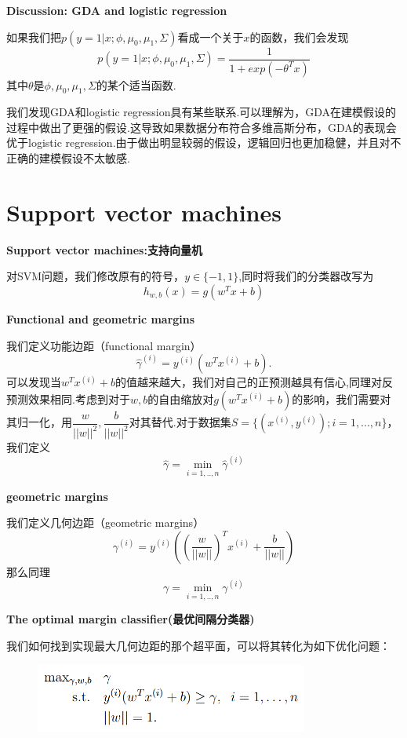 \documentclass[12pt, a4paper, oneside]{ctexbook}
\begin{document}
\hspace*{\fill}


\textbf{Discussion: GDA and logistic regression}

如果我们把$p(y=1|x;\phi,\mu_0,\mu_1,\Sigma)$看成一个关于$x$的函数，我们会发现\[p(y=1|x;\phi,\mu_0,\mu_1,\Sigma)=\dfrac{1}{1+exp(-\theta^{T}x)}\]其中$\theta$是$\phi,\mu_0,\mu_1,\Sigma$的某个适当函数.

\hspace*{\fill}

我们发现GDA和logistic regression具有某些联系.可以理解为，GDA在建模假设的过程中做出了更强的假设.这导致如果数据分布符合多维高斯分布，GDA的表现会优于logistic regression.由于做出明显较弱的假设，逻辑回归也更加稳健，并且对不正确的建模假设不太敏感.


\newpage


\section{Support vector machines}

\textbf{Support vector machines:支持向量机}

对SVM问题，我们修改原有的符号，$y\in \{-1,1\}$,同时将我们的分类器改写为\[h_{w,b}(x)=g(w^{T}x+b)\]

\textbf{Functional and geometric margins}

我们定义功能边距（functional margin）\[\hat{\gamma}^{(i)}=y^{(i)}(w^{T}x^{(i)}+b).\]可以发现当$w^{T}x^{(i)}+b$的值越来越大，我们对自己的正预测越具有信心,同理对反预测效果相同.考虑到对于$w,b$的自由缩放对$g(w^{T}x^{(i)}+b)$的影响，我们需要对其归一化，用$\dfrac{w}{||w||^2},\dfrac{b}{||w||^2}$对其替代.对于数据集$S=\{(x^{(i)},y^{(i)});i=1,...,n\}$，我们定义\[\hat{\gamma}=\min_{i=1,..,n}\hat{\gamma}^{(i)}\]

\hspace*{\fill}

\textbf{geometric margins}

我们定义几何边距（geometric margins）\[\gamma^{(i)}=y^{(i)}((\dfrac{w}{||w||})^{T}x^{(i)}+\dfrac{b}{||w||})\]那么同理\[{\gamma}=\min_{i=1,..,n}{\gamma}^{(i)}\]

\hspace*{\fill}

\textbf{The optimal margin classifier(最优间隔分类器)}

我们如何找到实现最大几何边距的那个超平面，可以将其转化为如下优化问题：

  \begin{figure}[h]
		\centering 
		\includegraphics[width=0.8\textwidth]{images37.png} 
	\end{figure}
\end{document}
